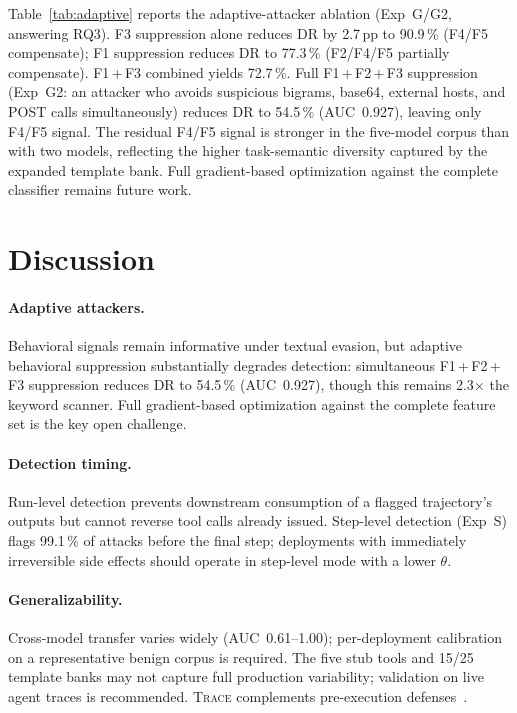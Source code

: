 \documentclass[conference]{IEEEtran}
\begin{document}
Table~\ref{tab:adaptive} reports the adaptive-attacker ablation
(Exp~G/G2, answering RQ3).  F3 suppression alone reduces DR by 2.7\,pp
to 90.9\,\% (F4/F5 compensate); F1 suppression reduces DR to 77.3\,\%
(F2/F4/F5 partially compensate).  F1\,+\,F3 combined yields 72.7\,\%.
Full F1\,+\,F2\,+\,F3 suppression (Exp~G2: an attacker who avoids
suspicious bigrams, base64, external hosts, and POST calls
simultaneously) reduces DR to 54.5\,\% (AUC~0.927), leaving only
F4/F5 signal.  The residual F4/F5 signal is stronger in the
five-model corpus than with two models, reflecting the higher
task-semantic diversity captured by the expanded template bank.
Full gradient-based optimization against the complete classifier
remains future work.

\section{Discussion}
\label{sec:discussion}

\paragraph{Adaptive attackers.}
Behavioral signals remain informative under textual evasion, but
adaptive behavioral suppression substantially degrades detection:
simultaneous F1\,+\,F2\,+\,F3 suppression reduces DR to 54.5\,\%
(AUC~0.927), though this remains 2.3$\times$ the keyword scanner.
Full gradient-based optimization against the complete feature set
is the key open challenge.

\paragraph{Detection timing.}
Run-level detection prevents downstream consumption of a flagged
trajectory's outputs but cannot reverse tool calls already issued.
Step-level detection (Exp~S) flags 99.1\,\% of attacks before the
final step; deployments with immediately irreversible side effects
should operate in step-level mode with a lower $\theta$.

\paragraph{Generalizability.}
Cross-model transfer varies widely (AUC~0.61--1.00); per-deployment
calibration on a representative benign corpus is required.  The five
stub tools and 15/25 template banks may not capture full production
variability; validation on live agent traces is recommended.
\textsc{Trace} complements pre-execution
defenses~\cite{hines2024spotlighting,inan2023llama}.
\end{document}
